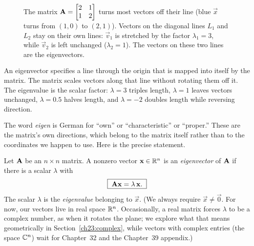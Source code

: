 \begin{figure}[H]
\caption{The matrix $\mathbf{A}=\protect\begin{bmatrix}2&1\\1&2\protect\end{bmatrix}$
turns most vectors off their line (blue $\vec{x}$ turns from $(1,0)$ to $(2,1)$).
Vectors on the diagonal lines $L_1$ and $L_2$ stay on their own lines:
$\vec{v}_1$ is stretched by the factor $\lambda_1=3$, while $\vec{v}_2$ is left
unchanged ($\lambda_2=1$). The vectors on these two lines are the eigenvectors.}
\label{ch23:fig-eigendirections}
\end{figure}

\begin{intuitionbox}
An eigenvector specifies a line through the origin that is mapped into itself by the
matrix. The matrix scales vectors along that line without rotating them off it. The
eigenvalue is the scalar factor: $\lambda=3$ triples length, $\lambda=1$ leaves vectors
unchanged, $\lambda=0.5$ halves length, and $\lambda=-2$ doubles length while reversing
direction.
\end{intuitionbox}

The word \emph{eigen} is German for ``own'' or ``characteristic'' or ``proper.''
These are the matrix's own directions, which belong to the matrix itself rather
than to the coordinates we happen to use. Here is the precise statement.

\begin{definition}
\label{ch23:def-eigen}
Let $\mathbf{A}$ be an $n\times n$ matrix. A nonzero vector $\mathbf{x}\in\mathbb{R}^n$ is an
\emph{eigenvector} of $\mathbf{A}$ if there is a scalar $\lambda$ with
\[
  \boxed{\;\mathbf{A}\mathbf{x}=\lambda\,\mathbf{x}.\;}
\]
The scalar $\lambda$ is the \emph{eigenvalue} belonging to $\vec{x}$. (We always
require $\vec{x}\neq\vec{0}$. For now, our vectors live in real space $\mathbb{R}^n$.
Occasionally, a real matrix forces $\lambda$ to be a complex number, as when it
rotates the plane; we explore what that means geometrically in Section~\ref{ch23:complex},
while vectors with complex entries (the space $\mathbb{C}^n$) wait for Chapter~32
and the Chapter~39 appendix.)
\end{definition}

